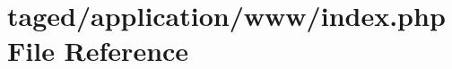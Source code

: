 \hypertarget{application_2www_2index_8php}{}\section{taged/application/www/index.php File Reference}
\label{application_2www_2index_8php}
